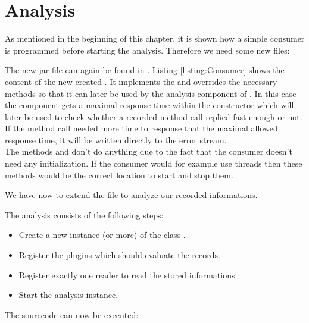 	\section{Analysis}
		As mentioned in the beginning of this chapter, it is shown how a simple consumer is programmed before starting the analysis. Therefore we need some new files:

		
		The new jar-file can again be found in . Listing \ref{listing:Consumer} shows the content of the new created . It implements the  and overrides the necessary methods so that it can later be used by the analysis component of \Kieker. In this case the component gets a maximal response time within the constructor which will later be used to check whether a recorded method call replied fast enough or not. If the method call needed more time to response that the maximal allowed response time, it will be written directly to the error stream.\\
		The methods  and  don't do anything due to the fact that the consumer doesn't need any initialization. If the consumer would for example use threads then these methods would be the correct location to start and stop them.

		\setJavaCodeListing       
		

		We have now to extend the file  to analyze our recorded informations.

		\setJavaCodeListing       
		

		\notify The analysis consists of the following steps:
		\begin{itemize}
			\item Create a new instance (or more) of the class .
			\item Register the plugins which should evaluate the records.
			\item Register exactly one reader to read the stored informations.
			\item Start the analysis instance.
		\end{itemize}
		The sourccode can now be executed:

